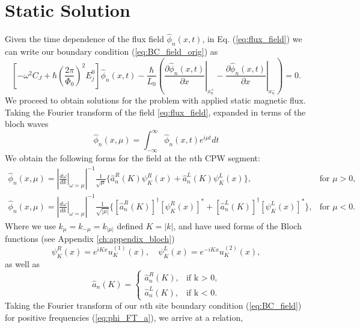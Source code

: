 \section{Static Solution}\label{eq:Static_Flux}
%
Given the time dependence of the flux field $\hat{\phi}_n(x,t)$, in Eq. (\ref{eq:flux_field}) we can write our boundary condition (\ref{eq:BC_field_orig}) as
%
\begin{equation}\label{eq:BC_field}
\left[-\omega^2 C_{J}+\hbar\left(\frac{2 \pi}{\Phi_{0}}\right)^{2} E_{j}^0\right]\hat{\phi}_n(x,t) -\frac{\hbar}{L_{0}}\left(\left.\frac{\partial \hat{\phi}_n(x,t)}{\partial x}\right|_{x_n^{+}}-\left.\frac{\partial \hat{\phi}_n(x,t)}{\partial x}\right|_{x_n^{-}}\right)=0.
\end{equation}
%
We proceed to obtain solutions for the problem with applied static magnetic flux. Taking the Fourier transform of the field \ref{eq:flux_field}, expanded in terms of the bloch waves
\begin{equation}\label{eq:field_FT}
    \hat{\phi}_n(x, \mu) = \int_{-\infty}^\infty \hat{\phi}_n(x,t) e^{i\mu t} dt
\end{equation}
%
We obtain the following forms for the field at the $n$th CPW segment:
\begin{subequations} \label{eq:phi_FT}
\begin{eqnarray}
    \hat{\phi}_n(x, \mu) =  \left|\left.\frac{d\omega}{dk}\right|_{\omega=\mu}\right|^{-1}\frac{1}{\sqrt{\mu}}\biggl\lbrace \hat{a}_n^R(K) \psi^R_K(x) + \hat{a}_n^L(K)\psi_K^L(x)\biggr\rbrace, &\text{for } \mu > 0, \label{eq:phi_FT_a}\\
    \hat{\phi}_n(x, \mu) = \left|\left.\frac{d\omega}{dk}\right|_{\omega=\mu}\right|^{-1}\frac{1}{\sqrt{|\mu|}}\biggl\lbrace [\hat{a}^R_n(K)]^\dagger \left[\psi^R_K(x)\right]^* + [\hat{a}_n^L(K)]^\dagger\left[\psi_K^L(x)\right]^*\biggr\rbrace, &\text{for } \mu < 0. \label{eq:phi_FT_b}
\end{eqnarray}
\end{subequations}
%
Where we use $k_{\mu} = k_{-\mu} = k_{|\mu|}$ defined $K = |k|$, and have used forms of the Bloch functions (see Appendix \ref{ch:appendix_bloch})
%
\begin{equation}\label{eq:bloch_waves}
    \psi_{K}^R (x) =e^{iKx} u_{K}^{(1)}(x), \hspace{12pt}  \psi_{K}^L(x) =e^{-iKx} u_{K}^{(2)}(x),
\end{equation}
%
as well as 
\begin{equation}
    \hat{a}_n(K) = 
    \begin{cases}
    \hat{a}_n^R(K), &\text{if k > 0,}\\
    \hat{a}_n^L(K), &\text{if k < 0.}
    \end{cases}
\end{equation}
%
Taking the Fourier transform of our $n$th site boundary condition (\ref{eq:BC_field}) for positive frequencies (\ref{eq:phi_FT_a}), we arrive at a relation,

